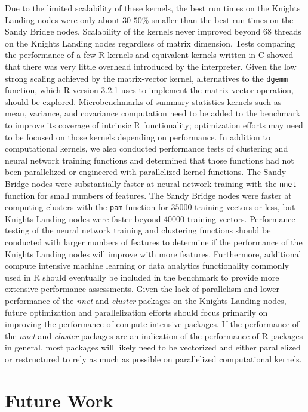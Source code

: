 Due to the limited scalability of these kernels, the best run times on the
  Knights Landing nodes were only about $30$-$50\%$ smaller than the best run
  times on the Sandy Bridge nodes.
Scalability of the kernels never improved beyond $68$ threads on the Knights
  Landing nodes regardless of matrix dimension.
Tests comparing the performance of a few R kernels and equivalent kernels
  written in C showed that there was very little overhead introduced by the
  interpreter.
Given the low strong scaling achieved by the matrix-vector kernel, alternatives
  to the \texttt{dgemm} function, which R version 3.2.1 uses to implement the
  matrix-vector operation, should be explored.
Microbenchmarks of summary statistics kernels such as mean, variance, and
  covariance computation need to be added to the benchmark to improve its
  coverage of intrinsic R functionality; optimization efforts may need to be
  focused on those kernels depending on performance.
In addition to computational kernels, we also conducted performance tests of
  clustering and neural network training functions and determined that those
  functions had not been parallelized or engineered with parallelized kernel
  functions.
The Sandy Bridge nodes were substantially faster at neural network training with
  the \texttt{nnet} function for small numbers of features.
The Sandy Bridge nodes were faster at computing clusters with the \texttt{pam}
  function for $35000$ training vectors or less, but Knights Landing nodes were
  faster beyond $40000$ training vectors.
Performance testing of the neural network training and clustering functions
  should be conducted with larger numbers of features to determine if the
  performance of the Knights Landing nodes will improve with more features.
Furthermore, additional compute intensive machine learning or data analytics
  functionality commonly used in R should eventually be included in the
  benchmark to provide more extensive performance assessments.
Given the lack of parallelism and lower performance of the \textit{nnet} and
  \textit{cluster} packages on the Knights Landing nodes, future optimization
  and parallelization efforts should focus primarily on improving the
  performance of compute intensive packages.
If the performance of the \textit{nnet} and \textit{cluster} packages are an
  indication of the performance of R packages in general, most packages will
  likely need to be vectorized and either parallelized or restructured to rely
  as much as possible on parallelized computational kernels.

\section{Future Work} \label{sec:future}

%



